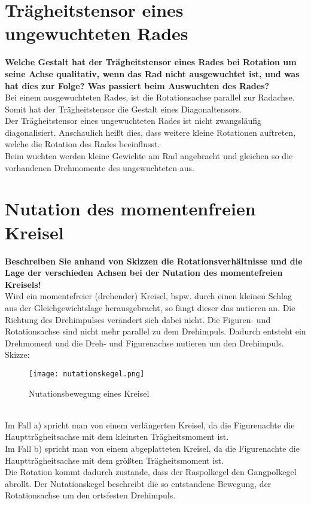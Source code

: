 \section{Trägheitstensor eines ungewuchteten Rades}
\textbf{Welche Gestalt hat der Trägheitstensor eines Rades bei Rotation um seine Achse qualitativ, wenn das Rad nicht ausgewuchtet ist, und was hat dies zur Folge? Was passiert beim Auswuchten des Rades?}\\
Bei einem ausgewuchteten Rades, ist die Rotationsachse parallel zur Radachse.
Somit hat der Trägheitstensor die Gestalt eines Diagonaltensors.\\
Der Trägheitstensor eines ungewuchteten Rades ist nicht zwangsläufig diagonalisiert.
Anschaulich heißt dies, dass weitere kleine Rotationen auftreten, welche die Rotation des Rades beeinflusst.\\
Beim wuchten werden kleine Gewichte am Rad angebracht und gleichen so die vorhandenen Drehmomente des ungewuchteten aus.
\section{Nutation des momentenfreien Kreisel}
\textbf{Beschreiben Sie anhand von Skizzen die Rotationsverhältnisse und die Lage der verschieden Achsen bei der Nutation des momentefreien Kreisels!}\\
Wird ein momentefreier (drehender) Kreisel, bspw. durch einen kleinen Schlag aus der Gleichgewichtslage herausgebracht,
so fängt dieser das nutieren an. Die Richtung des Drehimpulses verändert sich dabei nicht. 
Die Figuren- und Rotationsachse sind nicht mehr parallel zu dem Drehimpuls.
Dadurch entsteht ein Drehmoment und die Dreh- und Figurenachse nutieren um den Drehimpuls.\\
\newpage
Skizze:
\begin{figure}[h]
    \centering\texttt{[image: nutationskegel.png]}
    \caption{Nutationsbewegung eines Kreisel \citep[vgl.][]{Uni_aachen}}
\end{figure}\\
Im Fall a) spricht man von einem verlängerten Kreisel, da die Figurenachte die Hauptträgheitsachse mit dem kleinsten Trägheitsmoment ist.\\
Im Fall b) spricht man von einem abgeplatteten Kreisel, da die Figurenachte die Hauptträgheitsachse mit dem größten Trägheitsmoment ist. \citep[vgl.][]{Uni_aachen}\\%
Die Rotation kommt dadurch zustande, dass der Raspolkegel den Gangpolkegel abrollt.
Der Nutationskegel beschreibt die so entstandene Bewegung, der Rotationsachse um den ortsfesten Drehimpuls.
